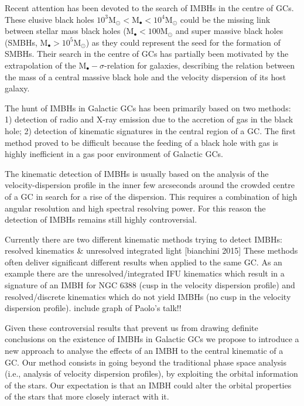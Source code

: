 \par Recent attention has been devoted to the search of \acp{IMBH} in the centre of \acp{GC}. These elusive black holes \(10^3 \mathrm{M}_\odot < \mathrm{M}_\bullet < 10^4 \mathrm{M}_\odot\) could be the missing link between stellar mass black holes (\(\mathrm{M}_\bullet < 100 \mathrm{M}_\odot\) and super massive black holes (\acsp{SMBH}, \(\mathrm{M}_\bullet > 10^5 \mathrm{M}_\odot\)) as they could represent the seed for the formation of \acp{SMBH}. Their search in the centre of \acp{GC} has partially been motivated by the extrapolation of the \(\mathrm{M}_\bullet-\sigma\)-relation for galaxies, describing the relation between the mass of a central massive black hole and the velocity dispersion of its host galaxy.
\par The hunt of \acp{IMBH} in Galactic \acp{GC} has been primarily based on two methods: 1) detection of radio and X-ray emission due to the accretion of gas in the black hole; 2) detection of kinematic signatures in the central region of a \ac{GC}. The first method proved to be difficult because the feeding of a black hole with gas is highly inefficient in a gas poor environment of Galactic \acp{GC}. 
\par The kinematic detection of \acp{IMBH} is usually based on the analysis of the velocity-dispersion profile in the inner few arcseconds around the crowded centre of a \ac{GC} in search for a rise of the dispersion. This requires a combination of high angular resolution and high spectral resolving power. For this reason the detection of \acp{IMBH} remains still highly controversial. 
\par Currently there are two different kinematic methods trying to detect \acp{IMBH}: \color{red} resolved kinematics \& unresolved integrated light [bianchini 2015] \color{black} These methods often deliver significant different results when applied to the same \ac{GC}. As an example there are the unresolved/integrated IFU kinematics which result in a signature of an \ac{IMBH} for NGC 6388 (cusp in the velocity dispersion profile) and resolved/discrete kinematics which do not yield \acp{IMBH} (no cusp in the velocity dispersion profile). \color{red} include graph of Paolo's talk!! \color{black} 
\par Given these controversial results that prevent us from drawing definite conclusions on the existence of \acp{IMBH} in Galactic \acp{GC} we propose to introduce a new approach to analyse the effects of an \ac{IMBH} to the central kinematic of a \ac{GC}. Our method consists in going beyond the traditional phase space analysis (i.e., analysis of velocity dispersion profiles), by exploiting the orbital information of the stars. Our expectation is that an \ac{IMBH} could alter the orbital properties of the stars that more closely interact with it.
\\

